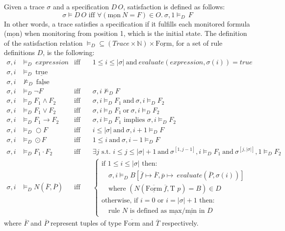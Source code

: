 \documentclass[english]{article}
\begin{document}
Given a trace $\sigma$ and a specification $D \, O$, satisfaction is defined as follows:
\[
\sigma \models D \, O \text{ iff } \forall (\underline{\text{mon}}\ N = F) \in O.\ \sigma ,1 \models_D \, F
\]
In other words, a trace satisfies a specification if it fulfills each monitored formula ($\underline{\text{mon}}$) when monitoring from position 1, which is the initial state. The definition of the satisfaction relation $\models_D \subseteq (Trace \times \mathbb{N}) \times \underline{\text{Form}}$, for a set of rule definitions $D$, is the following:
\begin{align*}
    \sigma, i &\models_D\ expression &\text{iff} \quad &1 \leq i \leq |\sigma|\ \text{and}\ evaluate(expression, \sigma(i)) = true \\
    \sigma, i &\models_D\ \underline{\text{true}} \\
    \sigma, i &\not\models_D\ \underline{\text{false}} \\
    \sigma, i &\models_D \neg F &\text{iff} \quad &\sigma, i \not\models_D F \\
    \sigma, i &\models_D F_1 \land F_2 &\text{iff} \quad &\sigma, i \models_D F_1\ \text{and}\ \sigma, i \models_D F_2 \\
    \sigma, i &\models_D F_1 \lor F_2 &\text{iff} \quad &\sigma, i \models_D F_1\ \text{or}\ \sigma, i \models_D F_2 \\
    \sigma, i &\models_D F_1 \rightarrow F_2 &\text{iff} \quad &\sigma, i \models_D F_1 \text{ implies } \sigma, i \models_D F_2 \\
    \sigma, i &\models_D \bigcirc F &\text{iff} \quad &i \leq |\sigma|\ \text{and}\ \sigma, i+1 \models_D F \\
    \sigma, i &\models_D \odot F &\text{iff} \quad &1 \leq i\ \text{and}\ \sigma, i-1 \models_D F \\
    \sigma, i &\models_D F_1 \cdot F_2 &\text{iff} \quad &\exists j \text{ s.t. } i \leq j \leq |\sigma|+1\ \text{and}\ \sigma^{[1, j-1]}, i \models_D F_1\ \text{and}\ \sigma^{[j,|\sigma|]}, 1 \models_D F_2 \\
    \sigma, i &\models_D N(\overline{F}, \overline{P}) &\text{iff} 
    &\begin{cases}
    \text{if } 1 \leq i \leq |\sigma| \text{ then:} \\
    \quad \sigma, i \models_D B[ \overline{f} \mapsto \overline{F}, \overline{p} \mapsto\ evaluate(\overline{P}, \sigma(i))] \\
    \quad \text{where } (N(\underline{\overline{\text{Form}}}\ \overline{f}, \text{T } p) = B) \in D \\
    \text{otherwise, if } i = 0 \text{ or } i = |\sigma|+1 \text{ then:} \\
    \quad \text{rule } N \text{ is defined as }\underline{\text{max}}/\underline{\text{min}}\text{ in } D
    \end{cases}
\end{align*}
where $\overline{F}$ and $\overline{P}$ represent tuples of type $\overline{\text{Form}}$ and $\overline{T}$ respectively.
    
\end{document}

